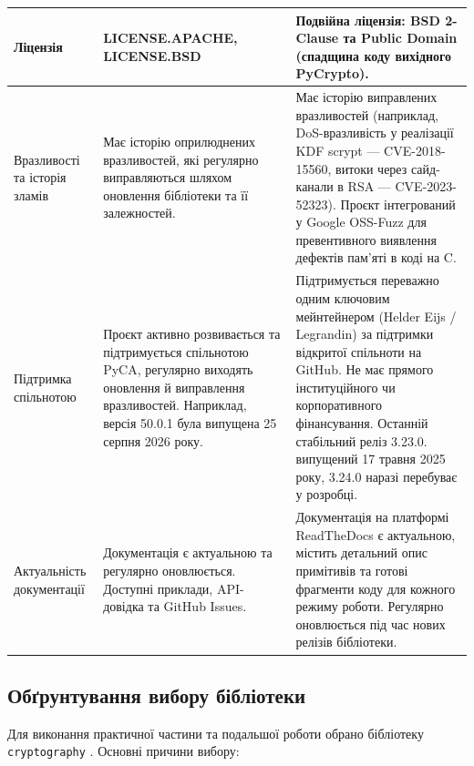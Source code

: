 \begin{longtable}{|p{2cm}|p{6cm}|p{6cm}|}
Ліцензія &
LICENSE.APACHE, \-LICENSE.BSD&
Подвійна ліцензія: BSD 2-Clause та Public Domain (спадщина коду вихідного PyCrypto). \\
\hline

Вразли\-вості та історія зламів &
Має історію оприлюднених вразливостей, 
які регулярно виправляються шляхом оновлення бібліотеки та її залежностей.&
Має історію виправлених вразливостей (наприклад, DoS-вразливість у реалізації KDF scrypt --- CVE-2018-15560, витоки через сайд-канали в RSA --- CVE-2023-52323). Проєкт інтегрований у Google OSS-Fuzz для превентивного виявлення дефектів пам'яті в коді на C. \\
\hline

Підтримка спільнотою &
Проєкт активно розвивається та підтримується спільнотою PyCA,
регулярно виходять оновлення й виправлення вразливостей.
Наприклад, версія 50.0.1 була випущена 25 серпня 2026 року.&
Підтримується переважно одним ключовим мейнтейнером (Helder Eijs / Legrandin) за підтримки відкритої спільноти на GitHub. Не має прямого інституційного чи корпоративного фінансування. Останній стабільний реліз 3.23.0. випущений 17 травня 2025 року, 3.24.0 наразі перебуває у розробці. \\
\hline

Актуаль\-ність документації &
Документація є актуальною та регулярно оновлюється. Доступні приклади, API-довідка та GitHub Issues. &
Документація на платформі ReadTheDocs є актуальною, містить детальний опис примітивів та готові фрагменти коду для кожного режиму роботи. Регулярно оновлюється під час нових релізів бібліотеки. \\
\hline

\end{longtable}

\subsection{Обґрунтування вибору бібліотеки}

Для виконання практичної частини та подальшої роботи обрано бібліотеку \texttt{cryptography} \cite{cryptography, cryptography git}. Основні причини вибору:


